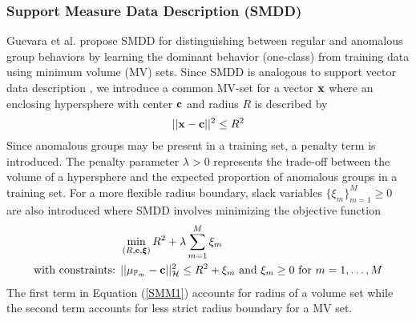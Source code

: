 \subsubsection{ Support Measure Data Description (SMDD) } 
 Guevara et al. \cite{SMDD} propose SMDD for  distinguishing between regular and anomalous  group behaviors by learning the dominant behavior (one-class) from   training data using minimum volume (MV) sets. {  Since SMDD is  analogous to support  vector data description \cite{SVDD}, we introduce a common MV-set for a vector ${\bf x}$ where an enclosing hypersphere with center $\bf c$ and radius $R$ is described by } 
\[ ||{\bf x}  -{\bf c}||^2 \le R^2 \]
 Since anomalous groups may be present in a training set, a penalty term is introduced. The penalty parameter $\lambda >0$ represents the trade-off between the volume of a  hypersphere and 
 the expected proportion of anomalous groups in a training set. 
 For a more flexible radius boundary, slack variables $\big\{\xi_m \big\}_{m=1}^M \ge 0$ are also introduced where SMDD %
 involves minimizing the objective function 
 \begin{align}
 &\min_{(R,{\bf c}, \boldsymbol\xi) }   R^2+\lambda \sum_{m=1}^M \xi_m \label{SMM1}  \\
\mbox{with constraints: } &||\mu_{\mathbb{P}_m}  -{\bf c}||^2 _\mathcal{H}\le R^2  +\xi_m  \mbox{ and } \xi_m  \ge 0 \mbox{ for } m=1,\dots,M  \nonumber
\end{align}
 The first term in Equation (\ref{SMM1}) accounts for radius of a volume set while the second term accounts for less strict radius boundary for a MV set. 






